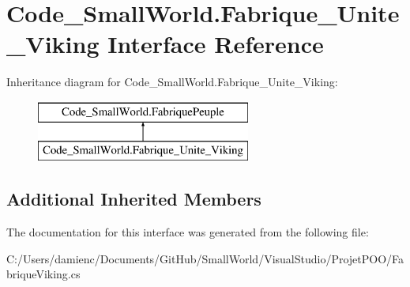 \hypertarget{interface_code___small_world_1_1_fabrique___unite___viking}{\section{Code\-\_\-\-Small\-World.\-Fabrique\-\_\-\-Unite\-\_\-\-Viking Interface Reference}
\label{interface_code___small_world_1_1_fabrique___unite___viking}
}
Inheritance diagram for Code\-\_\-\-Small\-World.\-Fabrique\-\_\-\-Unite\-\_\-\-Viking\-:\begin{figure}[H]
\begin{center}
\leavevmode
\includegraphics[height=2.000000cm]{interface_code___small_world_1_1_fabrique___unite___viking}
\end{center}
\end{figure}
\subsection*{Additional Inherited Members}


The documentation for this interface was generated from the following file\-:\begin{DoxyCompactItemize}
\item 
C\-:/\-Users/damienc/\-Documents/\-Git\-Hub/\-Small\-World/\-Visual\-Studio/\-Projet\-P\-O\-O/Fabrique\-Viking.\-cs\end{DoxyCompactItemize}

